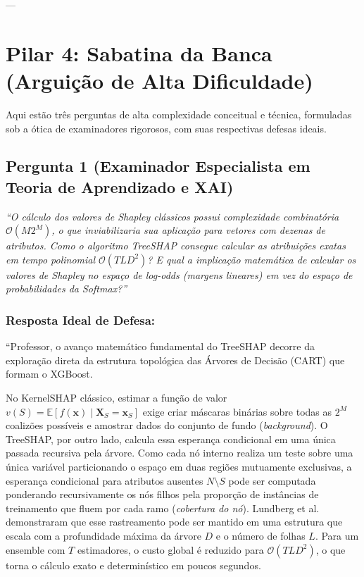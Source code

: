 \documentclass[11pt,a4paper]{article}
\begin{document}
---

\section{Pilar 4: Sabatina da Banca (Arguição de Alta Dificuldade)}

Aqui estão três perguntas de alta complexidade conceitual e técnica, formuladas sob a ótica de examinadores rigorosos, com suas respectivas defesas ideais.

\subsection{Pergunta 1 (Examinador Especialista em Teoria de Aprendizado e XAI)}
\textit{``O cálculo dos valores de Shapley clássicos possui complexidade combinatória $\mathcal{O}(M 2^M)$, o que inviabilizaria sua aplicação para vetores com dezenas de atributos. Como o algoritmo TreeSHAP consegue calcular as atribuições exatas em tempo polinomial $\mathcal{O}(T L D^2)$? E qual a implicação matemática de calcular os valores de Shapley no espaço de log-odds (margens lineares) em vez do espaço de probabilidades da Softmax?''}

\subsubsection{Resposta Ideal de Defesa:}
``Professor, o avanço matemático fundamental do TreeSHAP decorre da exploração direta da estrutura topológica das Árvores de Decisão (CART) que formam o XGBoost. 

No KernelSHAP clássico, estimar a função de valor $v(S) = \mathbb{E}[f(\mathbf{x}) \mid \mathbf{X}_S = \mathbf{x}_S]$ exige criar máscaras binárias sobre todas as $2^M$ coalizões possíveis e amostrar dados do conjunto de fundo (\textit{background}). O TreeSHAP, por outro lado, calcula essa esperança condicional em uma única passada recursiva pela árvore. Como cada nó interno realiza um teste sobre uma única variável particionando o espaço em duas regiões mutuamente exclusivas, a esperança condicional para atributos ausentes $N \setminus S$ pode ser computada ponderando recursivamente os nós filhos pela proporção de instâncias de treinamento que fluem por cada ramo (\textit{cobertura do nó}). Lundberg et al. demonstraram que esse rastreamento pode ser mantido em uma estrutura que escala com a profundidade máxima da árvore $D$ e o número de folhas $L$. Para um ensemble com $T$ estimadores, o custo global é reduzido para $\mathcal{O}(T L D^2)$, o que torna o cálculo exato e determinístico em poucos segundos.
\end{document}
